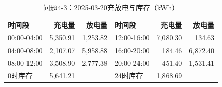 \begin{table}[H]\centering\small\caption{问题4-3：2025-03-20充放电与库存（kWh）}\label{tab:q4_320250320b}
\begin{tabular}{lrrlrr}\toprule
时间段 & 充电量 & 放电量 & 时间段 & 充电量 & 放电量\\\midrule
00:00-04:00 & 5,350.91 & 1,253.82 & 12:00-16:00 & 7,080.30 & 134.63\\
04:00-08:00 & 2,107.07 & 5,958.88 & 16:00-20:00 & 184.46 & 6,872.40\\
08:00-12:00 & 3,508.90 & 2,777.38 & 20:00-24:00 & 451.40 & 1,531.41\\
0时库存 & 5,641.21 &  & 24时库存 & 1,868.69 & \\
\bottomrule\end{tabular}\end{table}
